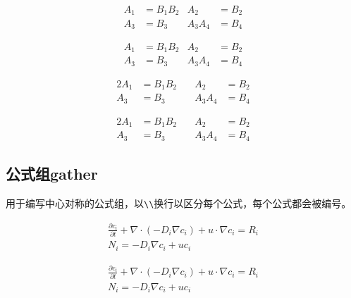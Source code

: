 \begin{latex}
\begin{align}
A_{1} & = B_{1}B_{2} & A_{2} & =B_{2} \\
A_{3} & = B_{3} & A_{3}A_{4} & =B_{4}
\end{align}
\end{latex}

\begin{align}
A_{1} & = B_{1}B_{2} & A_{2} & =B_{2} \\
A_{3} & = B_{3} & A_{3}A_{4} & =B_{4}
\end{align}


\begin{latex}
\begin{alignat}{2}
A_{1} & = B_{1}B_{2} \quad & A_{2} & =B_{2} \\
A_{3} & = B_{3} & A_{3}A_{4} & =B_{4}
\end{alignat}
\end{latex}

\begin{alignat}{2}
A_{1} & = B_{1}B_{2} \quad & A_{2} & =B_{2} \\
A_{3} & = B_{3} & A_{3}A_{4} & =B_{4}
\end{alignat}

\subsection{公式组gather}

用于编写中心对称的公式组，以\lstinline|\\|换行以区分每个公式，每个公式都会被编号。

\begin{latex}
\begin{gather}
\frac{\partial c_i}{\partial t}+\nabla \cdot (-D_{i} \nabla c_{i})+u \cdot \nabla c_{i}=R_i \\
N_{i}=-D_{i}\nabla c_{i}+uc_{i}
\end{gather}
\end{latex}

\begin{gather}
\frac{\partial c_i}{\partial t}+\nabla \cdot (-D_{i} \nabla c_{i})+u \cdot \nabla c_{i}=R_i \\
N_{i}=-D_{i}\nabla c_{i}+uc_{i}
\end{gather}

